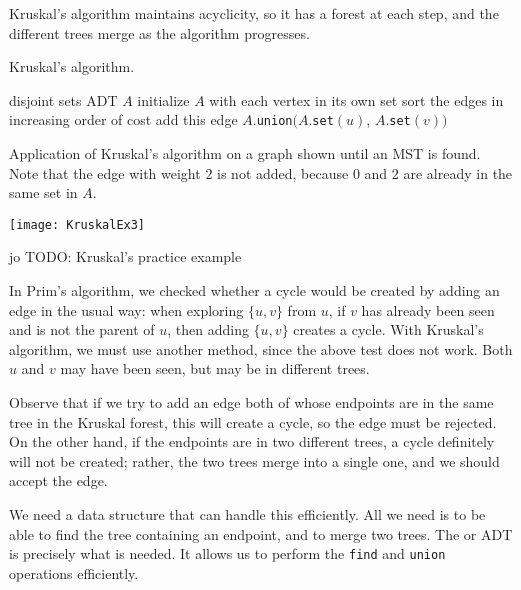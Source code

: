 Kruskal's algorithm maintains acyclicity, so it has a forest
at each step, and the different trees merge as the algorithm progresses.

\begin{algorithm}[H]
  \caption{Kruskal's algorithm.}
  \label{alg:kruskal}
\begin{algorithmic}[1]
	\State disjoint sets ADT $A$
	\State initialize $A$ with each vertex in its own set
	\State sort the edges in increasing order of cost
			\State add this edge
			\State $A$.\texttt{union}$(A$.\texttt{set}$(u)$, $A$.\texttt{set}$(v))$
		\EndIf
	\EndFor
	\State {}
\EndFunction
\end{algorithmic}
\end{algorithm}

\begin{Boxample}
Application of Kruskal's algorithm on a graph shown until an MST is found. 
Note that the edge  with weight $2$ is not added, 
because $0$ and $2$ are already in the same set in $A$.
\begin{center}
\texttt{[image: KruskalEx3]}
\end{center}
\end{Boxample}

\begin{Boxample}[0]
jo TODO: Kruskal's practice example
\end{Boxample}

In Prim's algorithm, we checked whether a cycle would be created by adding
an edge in the usual way: when exploring $\{u, v\}$ from $u$, if $v$ has
already been seen and is not the parent of $u$, then adding $\{u, v\}$
creates a cycle. With Kruskal's algorithm, we must use another method,
since the above test does not work. Both $u$ and $v$ may have been seen,
but may be in different trees.

Observe that if we try to add an edge both of whose endpoints are in
the same tree in the Kruskal forest, this will create a cycle, so the
edge must be rejected. On the other hand, if the endpoints are in two
different trees, a cycle definitely will not be created; rather, the two
trees merge into a single one, and we should accept the edge. 

We need a data structure that can handle this efficiently. All we need is to be
able to find the tree containing an endpoint, and to merge two trees. The
 or  ADT is precisely what
is needed. It allows us to perform the \texttt{find} and \texttt{union}
operations efficiently. %



